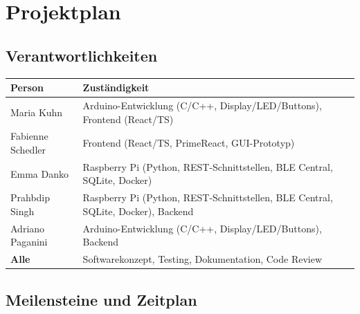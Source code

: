 \documentclass[12pt,a4paper]{article}
\begin{document}
\section{Projektplan}

\subsection{Verantwortlichkeiten}

\begin{center}
\begin{tabularx}{\textwidth}{lX}
  \toprule
  \textbf{Person} & \textbf{Zuständigkeit} \\
  \midrule
  Maria Kuhn      & Arduino-Entwicklung (C/C++, Display/LED/Buttons), Frontend (React/TS) \\
  Fabienne Schedler & Frontend (React/TS, PrimeReact, GUI-Prototyp) \\
  Emma Danko      & Raspberry Pi (Python, REST-Schnittstellen, BLE Central, SQLite, Docker) \\
  Prahbdip Singh  & Raspberry Pi (Python, REST-Schnittstellen, BLE Central, SQLite, Docker), Backend \\
  Adriano Paganini & Arduino-Entwicklung (C/C++, Display/LED/Buttons), Backend \\
  \midrule
  \textbf{Alle} & Softwarekonzept, Testing, Dokumentation, Code Review \\
  \bottomrule
\end{tabularx}
\end{center}

\subsection{Meilensteine und Zeitplan}
\end{document}
